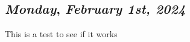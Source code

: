 \begin{center}
\section*{\month}
\end{center}

\def\day{\textit{February 1st, 2024}}
\def\weekday{\textit{Monday}}
\subsection*{\weekday, \day}

This is a test to see if it works